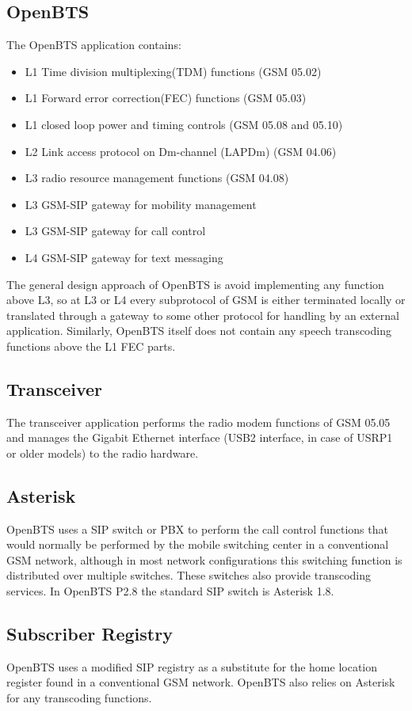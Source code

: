  \subsection{OpenBTS}
The OpenBTS application contains:
\begin{itemize}
\item L1 Time division multiplexing(TDM) functions (GSM 05.02)
\item L1 Forward error correction(FEC) functions (GSM 05.03)
\item L1 closed loop power and timing controls (GSM 05.08 and 05.10)
\item L2 Link access protocol on Dm-channel (LAPDm) (GSM 04.06)
\item L3 radio resource management functions (GSM 04.08)
\item L3 GSM-SIP gateway for mobility management
\item L3 GSM-SIP gateway for call control
\item L4 GSM-SIP gateway for text messaging
\end{itemize}

The general design approach of OpenBTS is avoid implementing any function above L3, so at L3 or L4 every subprotocol of GSM is either terminated locally or translated through a gateway to some other protocol for handling by an external application. Similarly, OpenBTS itself does not contain any speech transcoding functions above the L1 FEC parts.

\subsection{Transceiver}
The transceiver application performs the radio modem functions of GSM 05.05 and manages the Gigabit Ethernet interface
(USB2 interface, in case
of USRP1 or older models) to the radio hardware.

\subsection{Asterisk}
OpenBTS uses a SIP switch or PBX to perform the call control functions that would normally be performed by the mobile switching center in a conventional GSM network, although in most network configurations this switching function is distributed over multiple switches. These switches also provide transcoding services. In OpenBTS P2.8 the standard SIP switch is Asterisk 1.8.

\subsection{Subscriber Registry}
OpenBTS uses a modified SIP registry as a substitute for the home location register found in a conventional GSM network. OpenBTS also relies on Asterisk for any transcoding functions.

